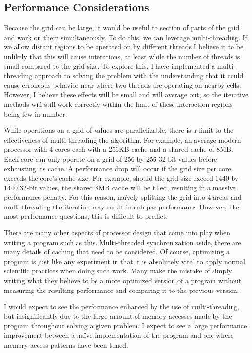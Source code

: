 \subsection{Performance Considerations}

Because the grid can be large, it would be useful to section of parts of the grid and work on them simultaneously. To do
this, we can leverage multi-threading. If we allow distant regions to be operated on by different threads I believe it
to be unlikely that this will cause interations, at least while the number of threads is small compared to the grid size.
To explore this, I have implemented a multi-threading approach to solving the problem with the understanding that it could
cause erroneous behavior near where two threads are operating on nearby cells. However, I believe these effects will be small and will average out,
so the iterative methods will still work correctly within the limit of these interaction regions being few in number.

While operations on a grid of values are parallelizable, there is a limit to
the effectiveness of multi-threading the algorithm. For example, an average
modern processor with 4 cores each with a 256KB cache and a shared cache of 8MB\@. Each core
can only operate on a grid of 256 by 256 32-bit values before exhausting its cache.
A performance drop will occur if the grid size per core exceeds the core's cache
size. For example, should the grid size exceed 1440 by 1440 32-bit values,
the shared 8MB cache will
be filled, resulting in a massive performance penalty. For this reason, na\"{i}vely splitting
the grid into 4 areas and multi-threading the iteration may result in sub-par performance.
However, like most performance questions, this is difficult to predict.

There are many other aspects of processor design that come into play when writing a program
such as this. Multi-threaded synchronization aside, there are many details of caching that
need to be considered. Of course, optimizing a program is just like any experiment in that
it is absolutely vital to apply normal scientific practices when doing such work. Many make
the mistake of simply writing what they believe to be a more optimized version of a program
without measuring the resulting performance and comparing it to the previous version.

I would expect to see the performance enhanced by the use of multi-threading, but insignificantly
due to the large amount of memory accesses made by the program throughout solving a given problem.
I expect to see a large performance improvement between a na\"{i}ve implementation of the program
and one where memory access patterns have been tuned.

